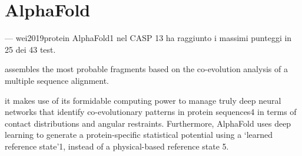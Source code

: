 \chapter{AlphaFold}

--- wei2019protein
AlphaFold1 nel CASP 13 ha raggiunto i massimi punteggi in 25 dei 43 test.

assembles the most probable
fragments based on the co-evolution
analysis of a multiple sequence alignment.

it makes
use of its formidable computing power
to manage truly deep neural networks
that identify co-evolutionary patterns in
protein sequences4 in terms of contact
distributions and angular restraints.
Furthermore, AlphaFold uses deep
learning to generate a protein-specific
statistical potential using a ‘learned
reference state’1, instead of a physical-based
reference state 5.




\clearpage